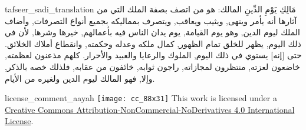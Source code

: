 \begin{taggedblock}{tafseer_sadi_translation}
{ مَالِكِ يَوْمِ الدِّينِ }
المالك: هو من اتصف بصفة الملك التي من آثارها أنه يأمر وينهى, ويثيب ويعاقب, ويتصرف بمماليكه بجميع أنواع التصرفات, وأضاف الملك ليوم الدين, وهو يوم القيامة, يوم يدان الناس فيه بأعمالهم, خيرها وشرها, لأن في ذلك اليوم, يظهر للخلق تمام الظهور, كمال ملكه وعدله وحكمته, وانقطاع أملاك الخلائق. حتى
[إنه]
يستوي في ذلك اليوم, الملوك والرعايا والعبيد والأحرار. كلهم مذعنون لعظمته, خاضعون لعزته, منتظرون لمجازاته, راجون ثوابه, خائفون من عقابه, فلذلك خصه بالذكر, وإلا, فهو المالك ليوم الدين ولغيره من الأيام.
\end{taggedblock}
\begin{taggedblock}{license_comment_aayah}
\texttt{[image: cc\_88x31]}
This work is licensed under a 
\href{http://creativecommons.org/licenses/by-nc-nd/4.0/}{Creative Commons Attribution-NonCommercial-NoDerivatives 4.0 International License}.
\end{taggedblock}
\begin{comment}
Please use the following for footnotes:- Sample\footnoteQ{Text of Qur'an footnote goes here.}.
Sample\footnoteT{Text of Tafseer footnote goes here.}.
\end{comment}